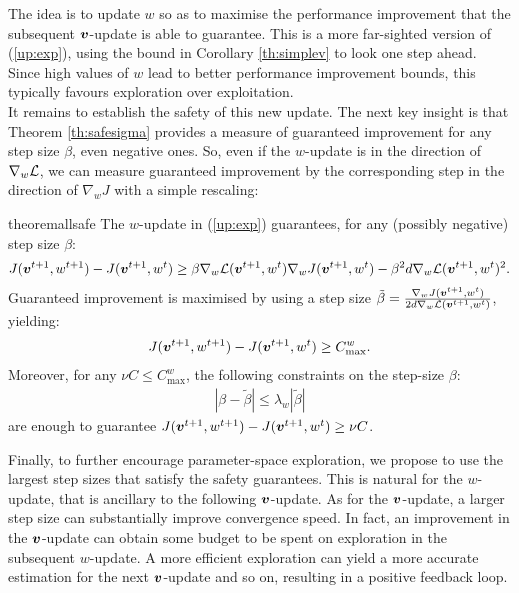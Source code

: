 %
The idea is to update $w$ so as to maximise the performance improvement that the subsequent $\vv$-update is able to guarantee. This is a more far-sighted version of (\ref{up:exp}), using the bound in Corollary \ref{th:simplev} to look one step ahead. Since high values of $w$ lead to better performance improvement bounds, this typically favours exploration over exploitation.\\
It remains to establish the safety of this new update. 
The next key insight is that Theorem \ref{th:safesigma} provides a measure of guaranteed improvement for any step size $\beta$, even negative ones. So, even if the $w$-update is in the direction of $\gradDelta$, we can measure guaranteed improvement by the corresponding step in the direction of $\nabla_{w}J$ with a simple rescaling:
\begin{restatable}[]{theorem}{allsafe}\label{th:safe_exp}
	The $w$-update in (\ref{up:exp}) guarantees, for any (possibly negative) step size $\beta$:
	\begin{align*}
	J(\vv^{t+1},w^{t+1}) - J(\vv^{t+1},w^t) \geq \beta\gradDelta(\vv^{t+1},w^t)\gradJ[w]{\vv^{t+1},w^t}-
	\beta^2 d \gradDelta(\vv^{t+1},w^t)^2.
	\end{align*}
	Guaranteed improvement is maximised by using a step size $\tilde{\beta} =\frac{\gradJ[w]{\vv^{t+1},w^t}}{2d\gradDelta(\vv^{t+1},w^t)}$, yielding:
	\begin{align*}
	J(\vv^{t+1},w^{t+1}) - J(\vv^{t+1}, w^t) \geq C_{\text{max}}^w. 
	\end{align*}
	Moreover, for any $\nu C\leq C_{\text{max}}^{w}$, the following constraints on the step-size $\beta$:
	\begin{align}\label{stat:4_3}
	|\beta - \tilde{\beta}| \leq \lambda_{w}|\tilde{\beta}|
	\end{align}
	are enough to guarantee $J(\vv^{t+1},w^{t+1}) - J(\vv^{t+1},w^t)\geq \nu C$.
\end{restatable}
%
Finally, to further encourage parameter-space exploration, we propose to use the largest step sizes that satisfy the safety guarantees. This is natural for the $w$-update, that is ancillary to the following $\vv$-update. As for the $\vv$-update, a larger step size can substantially improve convergence speed. In fact, an improvement in the $\vv$-update can obtain some budget to be spent on exploration in the subsequent $w$-update. A more efficient exploration can yield a more accurate estimation for the next $\vv$-update and so on, resulting in a positive feedback loop. \\
